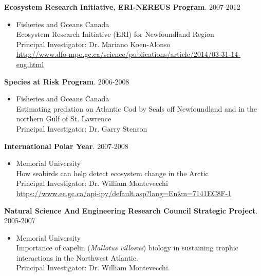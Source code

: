 \documentclass{res}
\begin{document}
\begin{resume}
\textbf{Ecosystem Research Initiative, ERI-NEREUS Program}. 2007-2012
\begin{itemize} %
	\item[]Fisheries and Oceans Canada\\
Ecosystem Research Initiative (ERI) for Newfoundland Region\\
Principal Investigator: Dr. Mariano Koen-Alonso\\
\url{http://www.dfo-mpo.gc.ca/science/publications/article/2014/03-31-14-eng.html}
\end{itemize}

\textbf{Species at Risk Program}. 2006-2008
\begin{itemize} %
	\item[] Fisheries and Oceans Canada\\
Estimating predation on Atlantic Cod by Seals off Newfoundland and in the northern Gulf of St. Lawrence \\
Principal Investigator: Dr. Garry Stenson
\end{itemize}



\textbf{International Polar Year}. 2007-2008
\begin{itemize} %
	\item[] Memorial University\\
How seabirds can help detect ecosystem change in the Arctic\\
Principal Investigator: Dr. William Montevecchi\\
\url{https://www.ec.gc.ca/api-ipy/default.asp?lang=En&n=7141EC8F-1}
\end{itemize}

\textbf{Natural Science And Engineering Research Council Strategic Project}. 2005-2007
\begin{itemize} %
	\item[] Memorial University\\
Importance of capelin (\textit{Mallotus villosus}) biology in sustaining trophic interactions in the Northwest Atlantic. \\
Principal Investigator: Dr. William Montevecchi.
\end{itemize}


\end{resume}
\end{document}
